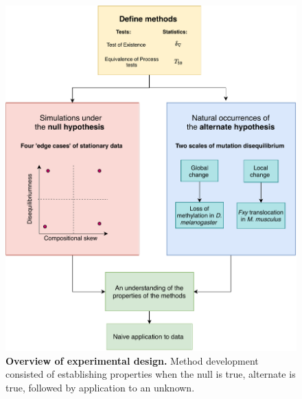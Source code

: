 \begin{figure}[htbp]
\centering
\includegraphics[width=\textwidth]{figures/diagrams/experimental_design.pdf}
\caption{\textbf{Overview of experimental design.} Method development consisted of establishing properties when the null is true, alternate is true, followed by application to an unknown.}
\label{fig:experimental_design}
\end{figure}